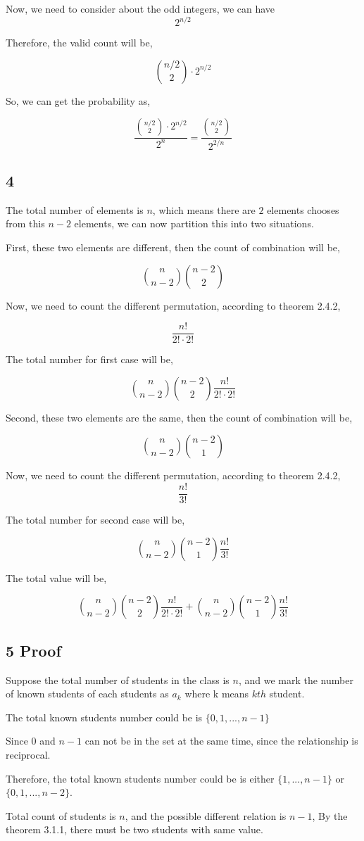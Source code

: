 \documentclass{article}
\begin{document}
Now, we need to consider about the odd integers, we can have 
$$2^{n/2}$$

Therefore, the valid count will be,

$${{n / 2} \choose 2} \cdot 2^{n/2}$$

So, we can get the probability as,

$$\frac {{{n / 2} \choose 2} \cdot 2^{n/2}}{2^n} = \frac {{{n / 2} \choose 2}}{2^{2 / n }}$$

\subsection*{4}
The total number of elements is $n$, which means there are $2$ elements chooses from this $n - 2$ elements, we can now partition this into two situations.

First, these two elements are different, then the count of combination will be,

$${n \choose {n - 2}} {{n - 2} \choose 2}$$

Now, we need to count the different permutation, according to theorem 2.4.2,

$$\frac{n!}{2! \cdot 2!}$$

The total number for first case will be,

$${n \choose {n - 2}} {{n - 2} \choose 2}\frac{n!}{2! \cdot 2!}$$

Second, these two elements are the same, then the count of combination will be,

$${n \choose {n - 2}} {{n - 2} \choose 1}$$

Now, we need to count the different permutation, according to theorem 2.4.2,
$$\frac{n!}{3!}$$

The total number for second case will be,

$${n \choose {n - 2}} {{n - 2} \choose 1}\frac{n!}{3!}$$

The total value will be,


$${n \choose {n - 2}} {{n - 2} \choose 2}\frac{n!}{2! \cdot 2!} + {n \choose {n - 2}} {{n - 2} \choose 1}\frac{n!}{3!}$$

\subsection*{5 Proof}

Suppose the total number of students in the class is $n$, and we mark the number of known students of each students as $a_k$ where k means $kth$ student.

The total known students number could be is $\{0, 1, ..., n-1 \}$

Since $0$ and $n - 1$ can not be in the set at the same time, since the relationship is reciprocal.

Therefore, the total known students number could be is either $\{1, ..., n-1 \}$ or $\{0, 1, ..., n-2 \}$.

Total count of students is $n$, and the possible different relation is $n - 1$, By the theorem 3.1.1, there must be two students with same value.
\end{document}
